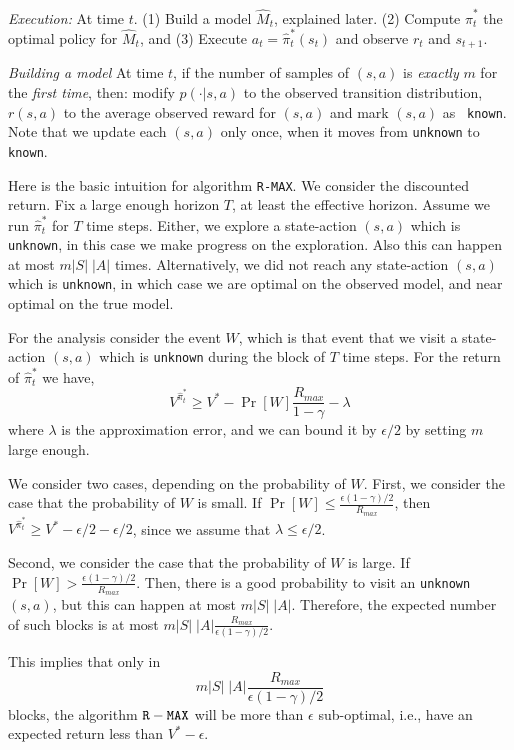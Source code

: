 {\em Execution:} At time $t$. (1) Build a model $\widehat{M}_t$,
explained later. (2) Compute $\widehat{\pi}^*_t$ the optimal policy for
$\widehat{M}_t$, and (3) Execute $a_t=\widehat{\pi}^*_t(s_t)$ and observe
$r_t$ and $s_{t+1}$.

{\em Building a model} At time $t$, if the number of samples of
$(s,a)$ is {\em exactly} $m$ for the {\em first time}, then: modify
$p(\cdot|s,a)$ to the observed transition distribution, $r(s,a)$ to
the average observed reward for $(s,a)$ and mark $(s,a)$ as {\tt
known}. Note that we update each $(s,a)$ only once, when it moves
from {\tt unknown} to {\tt known}.

Here is the basic intuition for algorithm {\tt R-MAX}. We consider the
discounted return. Fix a large enough horizon $T$, at least the
effective horizon. Assume we run $\widehat{\pi}^*_t$ for $T$ time steps.
Either, we explore a state-action $(s,a)$ which is {\tt unknown}, in
this case we make progress on the exploration. Also this can happen
at most $m|S|\;|A|$ times. Alternatively, we did not reach any
state-action $(s,a)$ which is {\tt unknown}, in which case we are
optimal on the observed model, and near optimal on the true model.

For the analysis consider the event $W$, which is that event that we
visit a state-action $(s,a)$ which is {\tt unknown} during the block
of $T$ time steps. For the return of $\widehat{\pi}^*_t$  we have,
\[
V^{\widehat{\pi}^*_t}\geq V^* - \Pr[W]\frac{R_{max}}{1-\gamma}-\lambda
\]
where $\lambda$ is the approximation error, and we can bound it by
$\epsilon/2$ by setting $m$ large enough.

We consider two cases, depending on the probability of $W$. First,
we consider the case that the probability of $W$ is small. If
$\Pr[W]\leq \frac{\epsilon(1-\gamma)/2}{R_{max}}$, then
$V^{\widehat{\pi}^*_t}\geq V^* -\epsilon/2 -\epsilon/2$, since we assume
that $\lambda\leq \epsilon/2$.

Second, we consider the case that the probability of $W$ is large.
If $\Pr[W] > \frac{\epsilon(1-\gamma)/2}{R_{max}}$. Then, there is a
good probability to visit an {\tt unknown} $(s,a)$, but this can
happen at most $m|S|\;|A|$. Therefore, the expected number of such
blocks is at most $m|S|\;|A|\frac{R_{max}}{\epsilon(1-\gamma)/2}$.

This implies that only in
\[
m|S|\;|A|\frac{R_{max}}{\epsilon(1-\gamma)/2}
\]
blocks, the algorithm ${\tt R-MAX}$ will be more than $\epsilon$
sub-optimal, i.e., have an expected return less than $V^*-\epsilon$.

